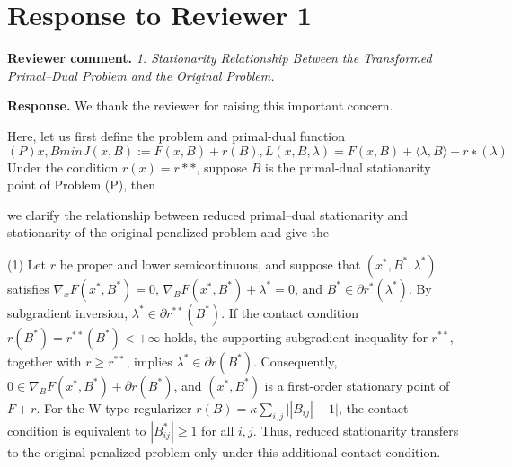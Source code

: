 \documentclass[11pt]{article}
\newcommand{\manuscripttitle}{[Paper Title]}
\newcommand{\journalname}{[Journal / Conference Name]}
\newcommand{\manuscriptid}{[Manuscript ID]}
\newcommand{\comment}[1]{%
  \vspace{0.6em}
  \noindent\textbf{Reviewer comment.} \emph{#1}
  \vspace{0.3em}
}
\newcommand{\response}[1]{%
  \noindent\textbf{Response.} #1
  \vspace{0.6em}
}
\begin{document}

\vspace{1em}



\vspace{0.5em}


\newpage

\section*{Response to Reviewer 1}

\comment{
1. Stationarity Relationship Between the Transformed Primal–Dual Problem and the Original Problem.
}

\response{
We thank the reviewer for raising this important concern.

Here, let us first define the problem and primal-dual function
\[
(P)
x,B
min
	​

J(x,B):=F(x,B)+r(B),
L(x,B,λ)=F(x,B)+⟨λ,B⟩−r
∗
(λ)
\]
Under the condition $r(x) = r**$, suppose $B$ is the primal-dual stationarity point of Problem (P), then 

 
we clarify the relationship between reduced primal--dual stationarity and stationarity of the original penalized problem and give the 

(1) 
Let $r$ be proper and lower semicontinuous, and suppose that $(x^*,B^*,\lambda^*)$ satisfies $\nabla_xF(x^*,B^*)=0$, $\nabla_BF(x^*,B^*)+\lambda^*=0$, and $B^*\in\partial r^*(\lambda^*)$. By subgradient inversion, $\lambda^*\in\partial r^{**}(B^*)$. If the contact condition $r(B^*)=r^{**}(B^*)<+\infty$ holds, the supporting-subgradient inequality for $r^{**}$, together with $r\ge r^{**}$, implies $\lambda^*\in\partial r(B^*)$. Consequently, $0\in\nabla_BF(x^*,B^*)+\partial r(B^*)$, and $(x^*,B^*)$ is a first-order stationary point of $F+r$. For the W-type regularizer $r(B)=\kappa\sum_{i,j}\bigl||B_{ij}|-1\bigr|$, the contact condition is equivalent to $|B_{ij}^*|\ge1$ for all $i,j$. Thus, reduced stationarity transfers to the original penalized problem only under this additional contact condition.
}
\end{document}
